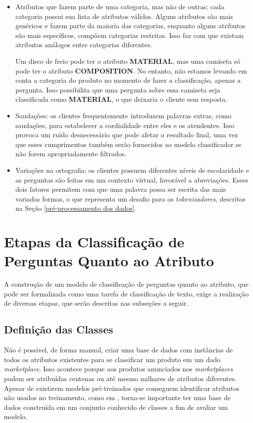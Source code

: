 \begin{itemize}
    \item Atributos que fazem parte de uma categoria, mas não de outras: cada categoria possui sua lista de atributos válidos. Alguns atributos são mais genéricos e fazem parte da maioria das categorias, enquanto alguns atributos são mais específicos, compõem categorias restritas. Isso faz com que existam atributos análogos entre categorias diferentes. 
    
    Um disco de freio pode ter o atributo \textbf{MATERIAL}, mas uma camiseta só pode ter o atributo \textbf{COMPOSITION}. No entanto, não estamos levando em conta a categoria do produto no momento de fazer a classificação, apenas a pergunta. Isso possibilita que uma pergunta sobre essa camiseta seja classificada como \textbf{MATERIAL}, o que deixaria o cliente sem resposta.
    \item Saudações: os clientes frequentemente introduzem palavras extras, como saudações, para estabelecer a cordialidade entre eles e os atendentes. Isso provoca um ruído desnecessário que pode afetar o resultado final, uma vez que esses cumprimentos também serão fornecidos ao modelo classificador se não forem apropriadamente filtrados.
    \item Variações na ortografia: os clientes possuem diferentes níveis de escolaridade e as perguntas são feitas em um contexto virtual, favorável a abreviações. Esses dois fatores permitem com que uma palavra possa ser escrita das mais variadas formas, o que representa um desafio para os \textit{tokenizadores}, descritos na Seção \ref{pré-processamento dos dados}.
    
    \end{itemize}

\section{Etapas da Classificação de Perguntas Quanto ao Atributo}
\label{etapas_classificação}
A construção de um modelo de classificação de perguntas quanto ao atributo, que pode ser formalizada como uma tarefa de classificação de texto, exige a realização de diversas etapas, que serão descritas nas subseções a seguir.

\subsection{Definição das Classes}
Não é possível, de forma manual, criar uma base de dados com instâncias de todos os atributos existentes para se classificar um produto em um dado \textit{marketplace}. Isso acontece porque aos produtos anunciados nos \textit{marketplaces} podem ser atribuídas centenas ou até mesmo milhares de atributos diferentes. Apesar de existirem modelos pré-treinados que conseguem identificar atributos não usados no treinamento, como em \cite{aliexpress}, torna-se importante ter uma base de dados construída em um conjunto conhecido de classes a fim de avaliar um modelo.

